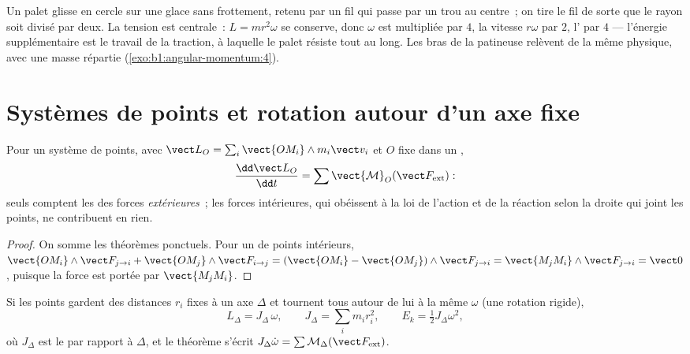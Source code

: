 \begin{example}\label{ex:b1:angular-momentum:puck}
Un palet glisse en cercle sur une glace sans frottement, retenu par un
fil qui passe par un trou au centre~; on tire le fil de sorte que le
rayon soit divisé par deux. La tension est centrale~: $L = mr^2\omega$
se conserve, donc $\omega$ est multipliée par $4$, la vitesse $r\omega$
par $2$, l' par $4$ --- l'énergie supplémentaire est le
travail de la traction, à laquelle le palet résiste tout au long. Les
bras de la patineuse relèvent de la même physique, avec une masse
répartie (\cref{exo:b1:angular-momentum:4}).
\end{example}

\section{Systèmes de points et rotation autour d'un axe fixe}

\begin{theorem}\label{thm:b1:angular-momentum:system}
Pour un système de points, avec $\vect L_O = \sum_i\vect{OM_i}\wedge m_i\vect v_i$
et $O$ fixe dans un ,
\[
\frac{\dd\vect L_O}{\dd t} = \sum\vect{\mathcal M}_O(\vect F_{\mathrm{ext}}):
\]
seuls comptent les  des forces \emph{extérieures}~; les forces
intérieures, qui obéissent à la loi de l'action et de la réaction selon
la droite qui joint les points, ne contribuent en rien.
\end{theorem}

\begin{proof}
On somme les théorèmes ponctuels. Pour un  de points intérieurs, $\vect{OM_i}\wedge\vect F_{j\to i}
+ \vect{OM_j}\wedge\vect F_{i\to j} = (\vect{OM_i} - \vect{OM_j})\wedge\vect F_{j\to i}
= \vect{M_jM_i}\wedge\vect F_{j\to i} = \vect 0$, puisque la force est portée par
$\vect{M_jM_i}$.
\end{proof}

\begin{proposition}\label{prop:b1:angular-momentum:inertia}
Si les points gardent des distances $r_i$ fixes à un axe $\Delta$ et
tournent tous autour de lui à la même  $\omega$ (une
rotation rigide),
\[
L_\Delta = J_\Delta\,\omega, \qquad J_\Delta = \sum_i m_ir_i^2, \qquad
E_k = \tfrac12 J_\Delta\omega^2,
\]
où $J_\Delta$ est le \emph{} par rapport à $\Delta$, et
le théorème s'écrit $J_\Delta\dot\omega = \sum\mathcal M_\Delta(\vect F_{\mathrm{ext}})$.
\end{proposition}


